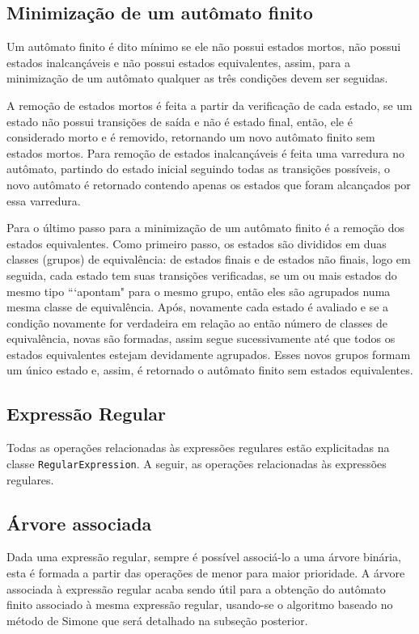 \documentclass{article}
\begin{document}
        \subsection{Minimização de um autômato finito}
            Um autômato finito é dito mínimo se ele não possui estados mortos,
            não possui estados inalcançáveis e não possui estados equivalentes,
            assim, para a minimização de um autômato qualquer as três condições
            devem ser seguidas.

            A remoção de estados mortos é feita a partir da verificação de cada
            estado, se um estado não possui transições de saída e não é estado
            final, então, ele é considerado morto e é removido, retornando um
            novo autômato finito sem estados mortos. Para remoção de estados
            inalcançáveis é feita uma varredura no autômato, partindo do estado
            inicial seguindo todas as transições possíveis, o novo autômato é
            retornado contendo apenas os estados que foram alcançados por essa
            varredura.

            Para o último passo para a minimização de um autômato finito é a
            remoção dos estados equivalentes. Como primeiro passo, os estados
            são divididos em duas classes (grupos) de equivalência: de estados
            finais e de estados não finais, logo em seguida, cada estado tem
            suas transições verificadas, se um ou mais estados do mesmo tipo
            ```apontam" para o mesmo grupo, então eles são agrupados numa mesma
            classe de equivalência. Após, novamente cada estado é avaliado e se
            a condição novamente for verdadeira em relação ao então número de
            classes de equivalência, novas são formadas, assim segue
            sucessivamente até que todos os estados equivalentes estejam
            devidamente agrupados. Esses novos grupos formam um único estado e,
            assim, é retornado o autômato finito sem estados equivalentes.

    \subsection{Expressão Regular}
        Todas as operações relacionadas às expressões regulares estão
        explicitadas na classe \texttt{RegularExpression}. A seguir, as
        operações relacionadas às expressões regulares.

        \subsection{Árvore associada}
            Dada uma expressão regular, sempre é possível associá-lo a uma
            árvore binária, esta é formada a partir das operações de menor para
            maior prioridade. A árvore associada à expressão regular acaba
            sendo útil para a obtenção do autômato finito associado à mesma
            expressão regular, usando-se o algoritmo baseado no método de
            Simone que será detalhado na subseção posterior.
\end{document}
